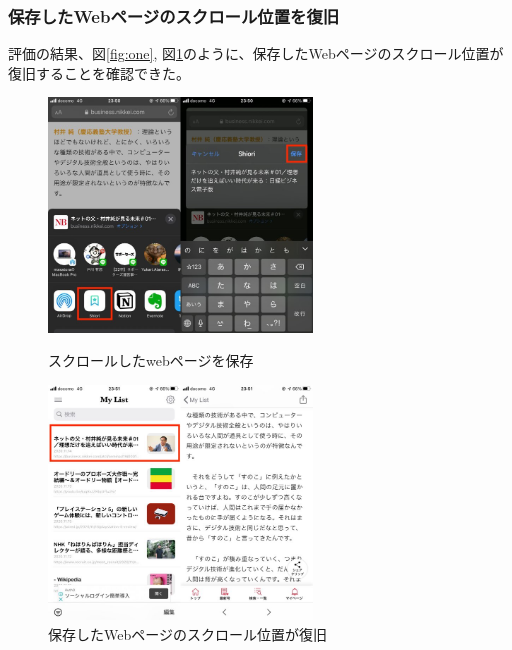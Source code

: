 \documentclass[a4j,10pt]{jsarticle}
\begin{document}
\subsubsection{保存したWebページのスクロール位置を復旧}
評価の結果、図\ref{fig:one}, 図\ref{fig:two}のように、保存したWebページのスクロール位置が復旧することを確認できた。
\begin{figure}[htbp]
    \begin{minipage}{0.5\hsize}
        \begin{center}
        \includegraphics[width=70mm]{../assets/scroll_position/scroll_position1.png}
        \end{center}
        \caption{スクロールしたwebページを保存}
        \label{fig:one}
    \end{minipage}
    \begin{minipage}{0.5\hsize}
        \begin{center}
        \includegraphics[width=70mm]{../assets/scroll_position/scroll_position2.png}
        \end{center}
        \caption{保存したWebページのスクロール位置が復旧}
        \label{fig:two}
    \end{minipage}
\end{figure}
\end{document}
